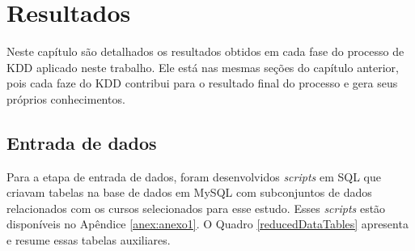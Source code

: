 \chapter{Resultados} \label{resultados}

Neste capítulo são detalhados os resultados obtidos em cada fase do processo de
KDD aplicado neste trabalho. Ele está nas mesmas seções do capítulo anterior,
pois cada faze do KDD contribui para o resultado final do processo e gera seus
próprios conhecimentos.

\section{Entrada de dados}

Para a etapa de entrada de dados, foram desenvolvidos \textit{scripts} em SQL
que criavam tabelas na base de dados em MySQL com subconjuntos de dados
relacionados com os cursos selecionados para esse estudo. Esses \textit{scripts}
estão disponíveis no Apêndice \ref{anex:anexo1}. O Quadro \ref{reducedDataTables}
apresenta e resume essas tabelas auxiliares.

